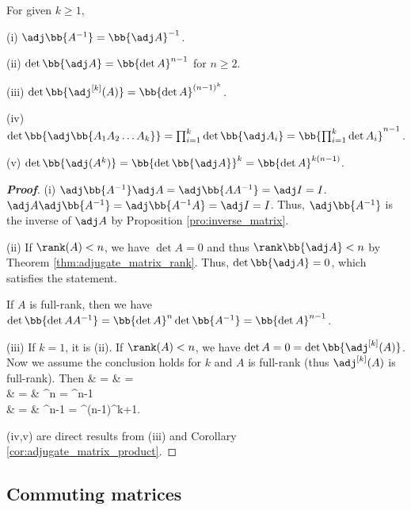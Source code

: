 \begin{proposition}\label{pro:adjugate_matrix_property}
For given $k \geq 1$,
\ben
\item [(i)] $\adj\bb{A^{-1}} = \bb{\adj A}^{-1}$.
\item [(ii)] $\det\bb{\adj A} = \bb{\det A}^{n-1}$ for $n\geq 2$.
\item [(iii)] $\det\bb{\adj^{[k]}(A)} = \bb{\det A}^{(n-1)^k}$.
\item [(iv)] $\det\bb{\adj\bb{A_1A_2\dots A_k}} = \prod^k_{i=1} \det\bb{\adj A_i} = \bb{\prod^k_{i=1} \det A_i}^{n-1}$.
\item [(v)] $\det\bb{\adj (A^k)} = \bb{\det \bb{\adj A}}^k = \bb{\det A}^{k(n-1)}$.
\een
\end{proposition}

\begin{proof}[\bf Proof]
\ben
\item [(i)] $\adj\bb{A^{-1}} \adj A = \adj \bb{A A^{-1}} = \adj I = I$. $\adj A \adj\bb{A^{-1}} = \adj \bb{A^{-1}A} = \adj I = I$. Thus, $\adj\bb{A^{-1}}$ is the inverse of $\adj A$ by Proposition \ref{pro:inverse_matrix}.
\item [(ii)] If $\rank(A) < n$, we have $\det A = 0$ and thus $\rank\bb{\adj A} < n$ by Theorem \ref{thm:adjugate_matrix_rank}. Thus, $\det\bb{\adj A} = 0$, which satisfies the statement.

If $A$ is full-rank, then we have $\det\bb{\det A A^{-1}} = \bb{\det A}^{n} \det\bb{A^{-1}} = \bb{\det A}^{n-1}$.

\item [(iii)] If $k = 1$, it is (ii). If $\rank(A) < n$, we have $\det A = 0 = \det\bb{\adj^{[k]}(A)}$. Now we assume the conclusion holds for $k$ and $A$ is full-rank (thus $\adj^{[k]}(A)$ is full-rank). Then
\beast
\det{} & = & \det {} = \det{} \\
& = & ^{n}\det{} = ^{n-1}\\
& = & ^{n-1} = ^{(n-1)^{k+1}}.
\eeast
\een

(iv,v) are direct results from (iii) and Corollary \ref{cor:adjugate_matrix_product}.
\end{proof}




\subsection{Commuting matrices}

